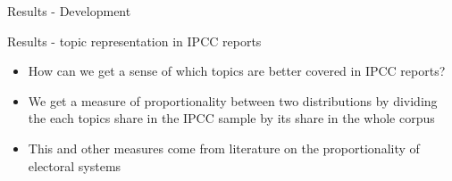 \documentclass[9pt]{beamer}
\begin{document}
\begin{frame}{Results - Development}
\end{frame}




\begin{frame}{Results - topic representation in IPCC reports}

\begin{itemize}
	\item<1-> How can we get a sense of which topics are better covered in IPCC reports?
	\item<2-> We get a measure of proportionality between two distributions by dividing the each topics share in the IPCC sample by its share in the whole corpus
	\item<3-> This and other measures come from literature on the proportionality of electoral systems \citep[e.g][]{Karpov2008}
\end{itemize}



\medskip




\end{frame}
\end{document}

